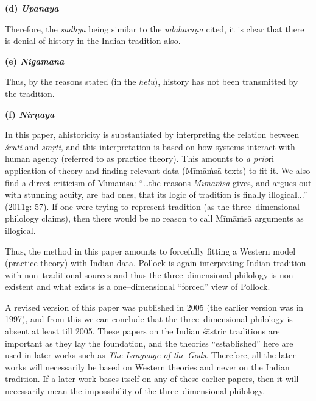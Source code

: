 \textbf{(d) \textit{Upanaya}}

Therefore, the \textit{sādhya} being similar to the \textit{udāharaṇa} cited, it is clear that there is denial of history in the Indian tradition also.

\textbf{(e) \textit{Nigamana}}

Thus, by the reasons stated (in the \textit{hetu}), history has not been transmitted by the tradition.

\textbf{(f) \textit{Nirṇaya}}

In this paper, ahistoricity is substantiated by interpreting the relation between \textit{śruti} and \textit{smṛti}, and this interpretation is based on how systems interact with human agency (referred to as practice theory). This amounts to \textit{a prio}ri application of theory and finding relevant data (Mīmāṁsā texts) to fit it. We also find a direct criticism of Mīmāṁsā: “…the reasons \textit{Mīmāṁsā} gives, and argues out with stunning acuity, are bad ones, that its logic of tradition is finally illogical...” (2011g: 57). If one were trying to represent tradition (as the three–dimensional philology claims), then there would be no reason to call Mīmāṁsā arguments as illogical.

\newpage

Thus, the method in this paper amounts to forcefully fitting a Western model (practice theory) with Indian data. Pollock is again interpreting Indian tradition with non–traditional sources and thus the three–dimensional philology is non–existent and what exists is a one–dimensional “forced” view of Pollock.

A revised version of this paper was published in 2005 (the earlier version was in 1997), and from this we can conclude that the three–dimensional philology is absent at least till 2005. These papers on the Indian śāstric traditions are important as they lay the foundation, and the theories “established” here are used in later works such as \textit{The Language of the Gods}. Therefore, all the later works will necessarily be based on Western theories and never on the Indian tradition. If a later work bases itself on any of these earlier papers, then it will necessarily mean the impossibility of the three–dimensional philology.


